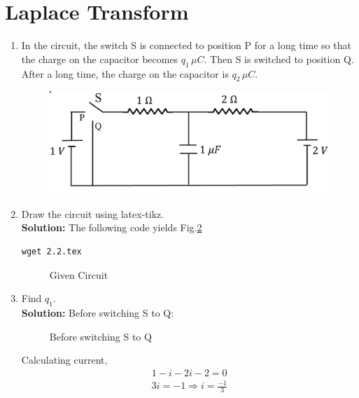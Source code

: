 \documentclass[journal,12pt,twocolumn]{IEEEtran}
\newcommand{\solution}{\noindent \textbf{Solution: }}
\numberwithin{equation}{section}
\renewcommand\thesection{\arabic{section}}
\begin{document}
 \section{Laplace Transform}
\begin{enumerate}[label=\arabic*.,ref=\thesection.\theenumi]
\item In the circuit, the switch S is connected to position P for a long time so that the charge on the capacitor
	becomes $q_1 \, \mu C$. Then S is switched to position Q.  After a long time, the charge on the capacitor is
		$q_2 \, \mu C$.
		\begin{figure}[!ht]
			\centering
			\includegraphics[width=\columnwidth]{figs/ckt.jpg}
			\caption{}
			\label{fig:ckt}
\end{figure}
\item Draw the circuit using latex-tikz.\\
\solution The following code yields Fig.\ref{fig:qn}
\begin{lstlisting}
wget 2.2.tex
\end{lstlisting}
\begin{figure}[!ht]
 \centering
  
\caption{Given Circuit}
\label{fig:qn}
\end{figure}

\item Find $q_1$.\\
\solution
Before switching S to Q:
\begin{figure}
	\centering
	 
   \caption{Before switching S to Q}
   \label{fig:c1}
\end{figure}
Calculating current,
\begin{align}
1-i-2i-2=0\\
3i=-1 \Rightarrow i=\frac{-1}{3}
\end{align}


\end{enumerate}
\end{document}

